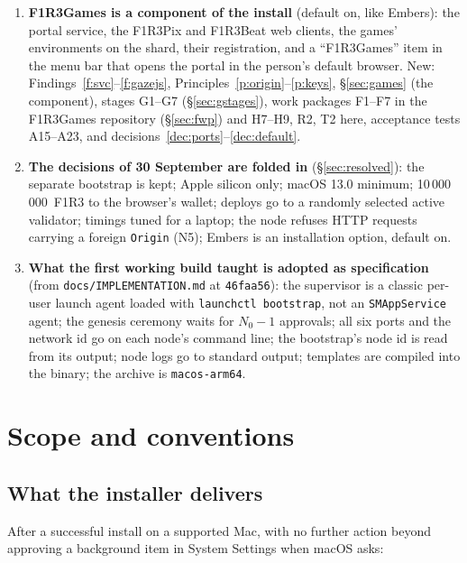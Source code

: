 \documentclass[11pt]{article}
\theoremstyle{definition}
\theoremstyle{remark}
\newcommand{\code}[1]{\texttt{#1}}
\newcommand{\Gm}{F1R3Games}
\newcommand{\Em}{Embers}
\begin{document}
\begin{enumerate}[itemsep=2pt]
\item \textbf{\Gm{} is a component of the install} (default on, like \Em{}): the
  portal service, the F1R3Pix and F1R3Beat web clients, the games' environments on
  the shard, their registration, and a ``F1R3Games'' item in the menu bar that opens
  the portal in the person's default browser. New: Findings~\ref{f:svc}--\ref{f:gazejs},
  Principles~\ref{p:origin}--\ref{p:keys}, \S\ref{sec:games} (the component),
  stages G1--G7 (\S\ref{sec:gstages}), work packages F1--F7 in the \Gm{} repository
  (\S\ref{sec:fwp}) and H7--H9, R2, T2 here, acceptance tests A15--A23, and
  decisions~\ref{dec:ports}--\ref{dec:default}.
\item \textbf{The decisions of 30 September are folded in} (\S\ref{sec:resolved}):
  the separate bootstrap is kept; Apple silicon only; macOS 13.0 minimum;
  10\,000\,000~F1R3 to the browser's wallet; deploys go to a randomly selected active
  validator; timings tuned for a laptop; the node refuses HTTP requests carrying a
  foreign \code{Origin} (N5); \Em{} is an installation option, default on.
\item \textbf{What the first working build taught is adopted as specification}
  (from \code{docs/IMPLEMENTATION.md} at \code{46faa56}): the supervisor is a classic
  per-user launch agent loaded with \code{launchctl bootstrap}, not an
  \code{SMAppService} agent; the genesis ceremony waits for $N_0 - 1$ approvals; all
  six ports and the network id go on each node's command line; the bootstrap's node
  id is read from its output; node logs go to standard output; templates are compiled
  into the binary; the archive is \code{macos-arm64}.
\end{enumerate}

\section{Scope and conventions}\label{sec:scope}

\subsection{What the installer delivers}

After a successful install on a supported Mac, with no further action beyond
approving a background item in System Settings when macOS asks:
\end{document}

